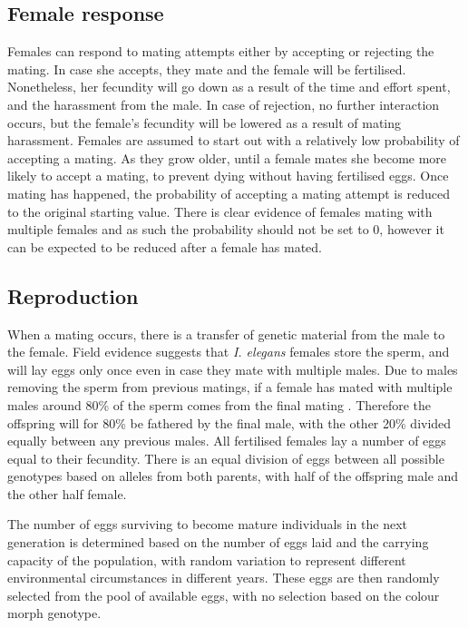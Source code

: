 \documentclass[10pt,letterpaper]{article}
\begin{document}
\subsection{Female response}
Females can respond to mating attempts either by accepting or rejecting the mating. In case she accepts, they mate and the female will be fertilised. Nonetheless, her fecundity will go down as a result of the time and effort spent, and the harassment from the male. In case of rejection, no further interaction occurs, but the female's fecundity will be lowered as a result of mating harassment. Females are assumed to start out with a relatively low probability of accepting a mating. As they grow older, until a female mates she become more likely to accept a mating, to prevent dying without having fertilised eggs. Once mating has happened, the probability of accepting a mating attempt is reduced to the original starting value. There is clear evidence of females mating with multiple females \cite{Cooper1996} and as such the probability should not be set to 0, however it can be expected to be reduced after a female has mated.

\subsection{Reproduction}
When a mating occurs, there is a transfer of genetic material from the male to the female. Field evidence suggests that \textit{I. elegans} females store the sperm, and will lay eggs only once even in case they mate with multiple males. Due to males removing the sperm from previous matings, if a female has mated with multiple males around 80\% of the sperm comes from the final mating \cite{Cooper1996, Cordoba2003}. Therefore the offspring will for 80\% be fathered by the final male, with the other 20\% divided equally between any previous males. All fertilised females lay a number of eggs equal to their fecundity. There is an equal division of eggs between all possible genotypes based on alleles from both parents, with half of the offspring male and the other half female.

The number of eggs surviving to become mature individuals in the next generation is determined based on the number of eggs laid and the carrying capacity of the population, with random variation to represent different environmental circumstances in different years. These eggs are then randomly selected from the pool of available eggs, with no selection based on the colour morph genotype.
\end{document}
